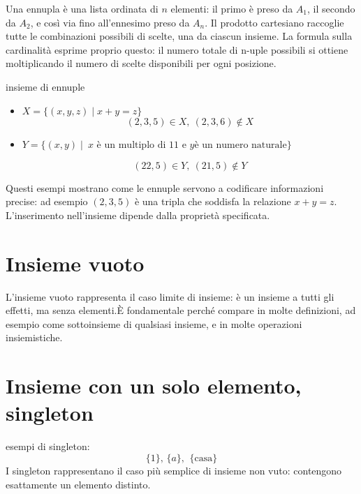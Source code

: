 Una ennupla è una lista ordinata di \(n\) elementi: il primo è preso da \(A_1\), il secondo da \(A_2\), e così via fino all’ennesimo preso da \(A_n\). Il prodotto cartesiano raccoglie tutte le combinazioni possibili di scelte, una da ciascun insieme. La formula sulla cardinalità esprime proprio questo: il numero totale di n-uple possibili si ottiene moltiplicando il numero di scelte disponibili per ogni posizione.



\begin{esempio}
    
 insieme di ennuple 
\begin{itemize}
    \item \(X= \{(x,y,z) \mid x+y = z\}\)
    \[
        (2,3,5) \in X, \ (2,3,6) \not \in X
    \]
     \item \(Y= \{(x,y) \mid \ x \text{ è un multiplo di 11 e } y \text{è un numero naturale} \}\)

\[
(22,5) \in Y , \  (21,5) \not  \in Y  
\]
\end{itemize}

Questi esempi mostrano come le ennuple servono a codificare informazioni precise: ad esempio  $(2,3,5)$ è una tripla che soddisfa la relazione $x+y=z$. L’inserimento nell’insieme dipende dalla proprietà specificata.
\end{esempio}




\section{Insieme vuoto}  
L'insieme vuoto rappresenta il caso limite di insieme: è un insieme a tutti gli effetti, ma senza elementi.È fondamentale perché compare in molte definizioni, ad esempio come sottoinsieme di qualsiasi insieme, e in molte operazioni insiemistiche.

\section{Insieme con un solo elemento, singleton}
\begin{esempio}
esempi di singleton:
    \[
    \{1\} \text{, } \{a\}\text{, } \ \{\text{casa}\}
\]
I singleton rappresentano il caso più semplice di insieme non vuto: contengono esattamente un elemento distinto.
\end{esempio} 


